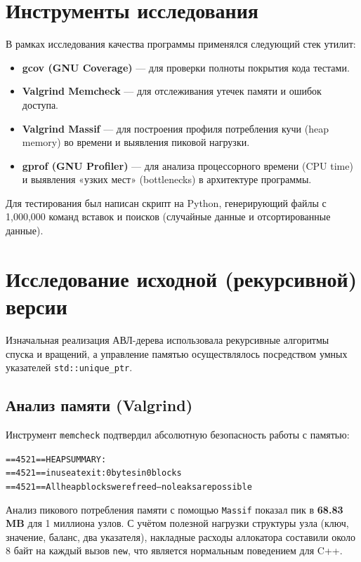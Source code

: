 \section{Инструменты исследования}

В рамках исследования качества программы применялся следующий стек утилит:
\begin{itemize}
    \item \textbf{gcov (GNU Coverage)} --- для проверки полноты покрытия кода тестами.
    \item \textbf{Valgrind Memcheck} --- для отслеживания утечек памяти и ошибок доступа.
    \item \textbf{Valgrind Massif} --- для построения профиля потребления кучи (heap memory) во времени и выявления пиковой нагрузки.
    \item \textbf{gprof (GNU Profiler)} --- для анализа процессорного времени (CPU time) и выявления «узких мест» (bottlenecks) в архитектуре программы.
\end{itemize}

Для тестирования был написан скрипт на Python, генерирующий файлы с 1,000,000 команд вставок и поисков (случайные данные и отсортированные данные).

\section{Исследование исходной (рекурсивной) версии}

Изначальная реализация АВЛ-дерева использовала рекурсивные алгоритмы спуска и вращений, а управление памятью осуществлялось посредством умных указателей \texttt{std::unique\_ptr}. 

\subsection*{Анализ памяти (Valgrind)}
Инструмент \texttt{memcheck} подтвердил абсолютную безопасность работы с памятью:
\begin{alltt}
==4521== HEAP SUMMARY:
==4521==     in use at exit: 0 bytes in 0 blocks
==4521== All heap blocks were freed -- no leaks are possible
\end{alltt}
Анализ пикового потребления памяти с помощью \texttt{Massif} показал пик в \textbf{68.83 MB} для 1 миллиона узлов. С учётом полезной нагрузки структуры узла (ключ, значение, баланс, два указателя), накладные расходы аллокатора составили около 8 байт на каждый вызов \texttt{new}, что является нормальным поведением для C++.

